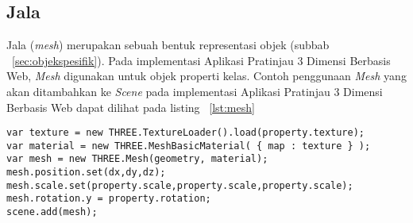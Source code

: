 \subsection{Jala}
Jala ({\it mesh}) merupakan sebuah bentuk representasi objek (subbab ~\ref{sec:objekspesifik}). Pada implementasi Aplikasi Pratinjau 3 Dimensi Berbasis Web, {\it Mesh} digunakan untuk objek properti kelas. Contoh penggunaan {\it Mesh} yang akan ditambahkan ke {\it Scene} pada implementasi Aplikasi Pratinjau 3 Dimensi Berbasis Web dapat dilihat pada listing ~\ref{lst:mesh}
\begin{lstlisting}[caption={Contoh penggunaan {\it Mesh}}, label={lst:mesh},captionpos=b]
var texture = new THREE.TextureLoader().load(property.texture);
var material = new THREE.MeshBasicMaterial( { map : texture } ); 
var mesh = new THREE.Mesh(geometry, material);
mesh.position.set(dx,dy,dz);
mesh.scale.set(property.scale,property.scale,property.scale);
mesh.rotation.y = property.rotation;
scene.add(mesh);
\end{lstlisting}

